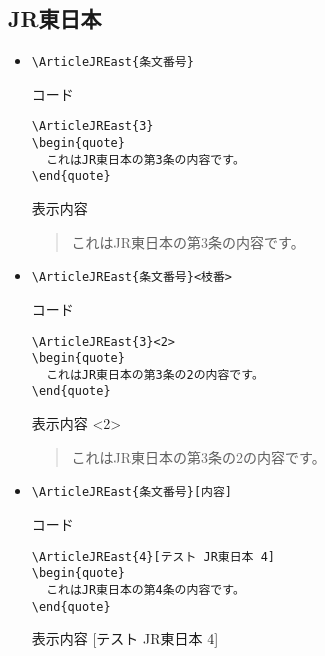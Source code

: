 \documentclass[oneside,10pt,a4paper]{jsarticle}
\begin{document}
  \subsection{JR東日本}

  \begin{itemize}
    \item \verb|\ArticleJREast{条文番号}|
      \begin{itembox}[l]{コード}
        {\footnotesize\begin{verbatim}
\ArticleJREast{3}
\begin{quote}
  これはJR東日本の第3条の内容です。
\end{quote}\end{verbatim}}
      \end{itembox}
      \begin{itembox}[l]{表示内容}
        \begin{quote}
          これはJR東日本の第3条の内容です。
        \end{quote}
      \end{itembox}
    \item \verb|\ArticleJREast{条文番号}<枝番>|
      \begin{itembox}[l]{コード}
        {\footnotesize\begin{verbatim}
\ArticleJREast{3}<2>
\begin{quote}
  これはJR東日本の第3条の2の内容です。
\end{quote}\end{verbatim}}
      \end{itembox}
      \begin{itembox}[l]{表示内容}
        <2>
        \begin{quote}
          これはJR東日本の第3条の2の内容です。
        \end{quote}
      \end{itembox}
    \newpage
    \item \verb|\ArticleJREast{条文番号}[内容]|
      \begin{itembox}[l]{コード}
        {\footnotesize\begin{verbatim}
\ArticleJREast{4}[テスト JR東日本 4]
\begin{quote}
  これはJR東日本の第4条の内容です。
\end{quote}\end{verbatim}}
      \end{itembox}
      \begin{itembox}[l]{表示内容}
        [テスト JR東日本 4]

\end{itembox}
\end{itemize}
\end{document}
